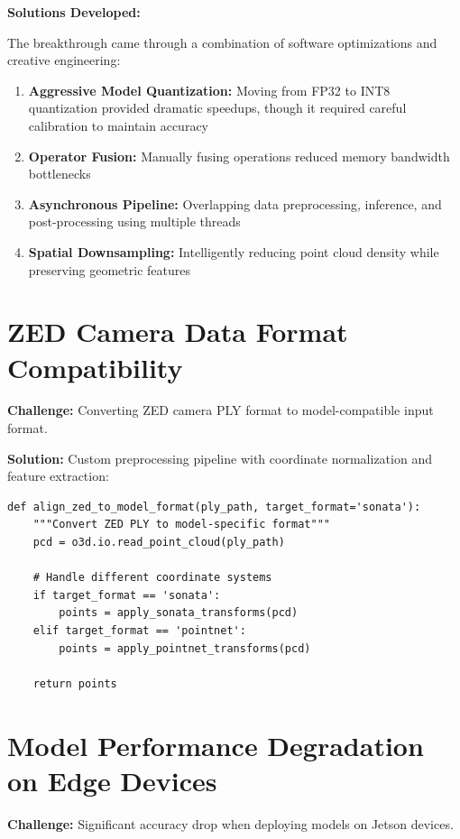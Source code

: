 \documentclass[12pt,a4paper]{report}
\begin{document}
\textbf{Solutions Developed:}

The breakthrough came through a combination of software optimizations and creative engineering:

\begin{enumerate}
    \item \textbf{Aggressive Model Quantization:} Moving from FP32 to INT8 quantization provided dramatic speedups, though it required careful calibration to maintain accuracy
    \item \textbf{Operator Fusion:} Manually fusing operations reduced memory bandwidth bottlenecks
    \item \textbf{Asynchronous Pipeline:} Overlapping data preprocessing, inference, and post-processing using multiple threads
    \item \textbf{Spatial Downsampling:} Intelligently reducing point cloud density while preserving geometric features
\end{enumerate}

\section{ZED Camera Data Format Compatibility}

\textbf{Challenge:} Converting ZED camera PLY format to model-compatible input format.

\textbf{Solution:} Custom preprocessing pipeline with coordinate normalization and feature extraction:

\begin{lstlisting}[caption=ZED to Model Format Alignment, label=lst:zed_alignment]
def align_zed_to_model_format(ply_path, target_format='sonata'):
    """Convert ZED PLY to model-specific format"""
    pcd = o3d.io.read_point_cloud(ply_path)

    # Handle different coordinate systems
    if target_format == 'sonata':
        points = apply_sonata_transforms(pcd)
    elif target_format == 'pointnet':
        points = apply_pointnet_transforms(pcd)

    return points
\end{lstlisting}

\section{Model Performance Degradation on Edge Devices}

\textbf{Challenge:} Significant accuracy drop when deploying models on Jetson devices.
\end{document}
